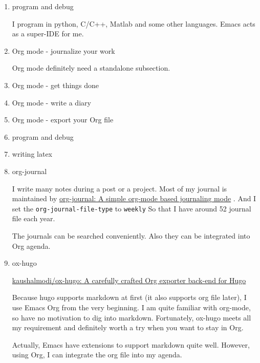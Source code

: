 \documentclass[koma,letterpaper,captions=tableheading,ctex,11pt,listings-sv,microtype,paralist,colorlinks=true,urlcolor=blue]{org-article}
\begin{document}
\begin{enumerate}
\item program and debug
\label{sec:org954f607}


I program in python, C/C++, Matlab and some other languages. Emacs acts as a
super-IDE for me.


\item Org mode - journalize your work
\label{sec:org0cf6dc5}


Org mode definitely need a standalone subsection.

\item Org mode - get things done
\label{sec:orgd228748}



\item Org mode - write a diary
\label{sec:orgd304635}

\item Org mode - export your Org file
\label{sec:orgf2a7087}


\item program and debug
\label{sec:org81e3cf7}


\item writing latex
\label{sec:orgb6b215c}
\item org-journal
\label{sec:org7fba657}


I write many notes during a post or a project. Most of my journal is maintained
by \href{https://github.com/bastibe/org-journal}{org-journal: A simple org-mode based journaling mode} . And I set the
\texttt{org-journal-file-type} to \texttt{weekly} So that I have around 52 journal file each
year.

The journals can be searched conveniently. Also they can be integrated into Org
agenda.


\item ox-hugo
\label{sec:org5bd6c0b}


\href{https://github.com/kaushalmodi/ox-hugo}{kaushalmodi/ox-hugo: A carefully crafted Org exporter back-end for Hugo}

Because hugo supports markdown at first (it also supports org file later), I use
Emacs Org from the very beginning. I am quite familiar with org-mode, so have no
motivation to dig into markdown. Fortunately, ox-hugo meets all my requirement
and definitely worth a try when you want to stay in Org.

Actually, Emacs have extensions to support markdown quite well. However, using
Org, I can integrate the org file into my agenda.
\end{enumerate}
\end{document}
